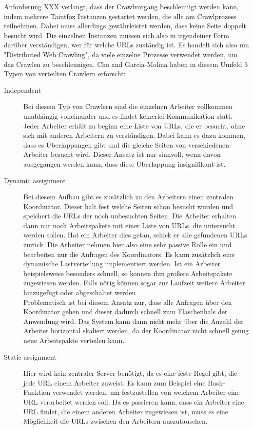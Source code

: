 Anforderung XXX verlangt, dass der Crawlvorgang beschleunigt werden kann, indem mehrere Taintfox Instanzen gestartet werden, die alle am Crawlprozess teilnehmen. Dabei muss allerdings gewährleistet werden, dass keine Seite doppelt besucht wird. Die einzelnen Instanzen müssen sich also in irgendeiner Form darüber verständigen, wer für welche URLs zuständig ist. 
Es handelt sich also um "Distributed Web Crawling", da viele einzelne Prozesse verwendet werden, um das Crawlen zu beschleunigen. 
Cho and Garcia-Molina haben in diesem Umfeld 3 Typen von verteilten Crawlern erforscht: %
\begin{description}
	\item[Independent] 
	Bei diesem Typ von Crawlern sind die einzelnen Arbeiter vollkommen unabhängig voneinander und es findet keinerlei Kommunikation statt. Jeder Arbeiter erhält zu beginn eine Liste von URLs, die er besucht, ohne sich mit anderen Arbeitern zu verständigen. Dabei kann es dazu kommen, dass es Überlappungen gibt und die gleiche Seiten von verschiedenen Arbeiter besucht wird. Dieser Ansatz ist nur sinnvoll, wenn davon ausgegangen werden kann, dass diese Überlappung insignifikant ist.
	\item[Dynamic assignment]
	Bei diesem Aufbau gibt es zusätzlich zu den Arbeitern einen zentralen Koordinator. Dieser hält fest welche Seiten schon besucht wurden und speichert die URLs der noch unbesuchten Seiten. Die Arbeiter erhalten dann nur noch Arbeitspakete mit einer Liste von URLs, die untersucht werden sollen. Hat ein Arbeiter dies getan, schick er alle gefundenen URLs zurück. Die Arbeiter nehmen hier also eine sehr passive Rolle ein und bearbeiten nur die Anfragen des Koordinators. Es kann zusätzlich eine dynamische Lastverteilung implementiert werden. Ist ein Arbeiter beispielsweise besonders schnell, so können ihm größere Arbeitspakete zugewiesen werden. Falls nötig können sogar zur Laufzeit weitere Arbeiter hinzugefügt oder abgeschaltet werden\\
	Problematisch ist bei diesem Ansatz nur, dass alle Anfragen über den Koordinator gehen und dieser dadurch schnell zum Flaschenhals der Anwendung wird. Das System kann dann nicht mehr über die Anzahl der Arbeiter horizontal skaliert werden, da der Koordinator nicht schnell genug neue Arbeitspakte verteilen kann.
	\item[Static assignment] 
	Hier wird kein zentraler Server benötigt, da es eine feste Regel gibt, die jede URL einem Arbeiter zuweist. Es kann zum Beispiel eine Hash-Funktion verwendet werden, um festzustellen von welchem Arbeiter eine URL verarbeitet werden soll. Da es passieren kann, dass ein Arbeiter eine URL findet, die einem anderen Arbeiter zugewiesen ist, muss es eine Möglichkeit die URLs zwischen den Arbeitern auszutauschen.
\end{description}

